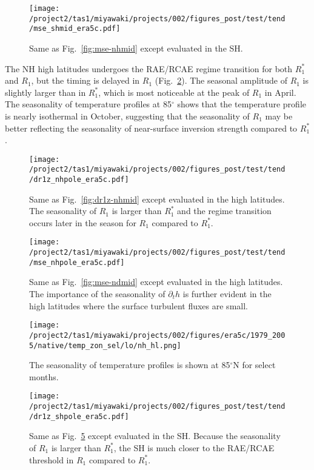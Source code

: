 \documentclass{article}
\begin{document}
\begin{figure}
    \texttt{[image: /project2/tas1/miyawaki/projects/002/figures\_post/test/tend/mse\_shmid\_era5c.pdf]}
    \caption{Same as Fig.~\ref{fig:mse-nhmid} except evaluated in the SH.}
    \label{fig:mse-shmid}
\end{figure}

The NH high latitudes undergoes the RAE/RCAE regime transition for both $R_1^*$ and $R_1$, but the timing is delayed in $R_1$ (Fig.~\ref{fig:dr1z-nhpole}). The seasonal amplitude of $R_1$ is slightly larger than in $R_1^*$, which is most noticeable at the peak of $R_1$ in April. The seasonality of temperature profiles at 85$^\circ$ shows that the temperature profile is nearly isothermal in October, suggesting that the seasonality of $R_1$ may be better reflecting the seasonality of near-surface inversion strength compared to $R_1^*$.

\begin{figure}
    \texttt{[image: /project2/tas1/miyawaki/projects/002/figures\_post/test/tend/dr1z\_nhpole\_era5c.pdf]}
    \caption{Same as Fig.~\ref{fig:dr1z-nhmid} except evaluated in the high latitudes. The seasonality of $R_1$ is larger than $R_1^*$ and the regime transition occurs later in the season for $R_1$ compared to $R_1^*$.}
    \label{fig:dr1z-nhpole}
\end{figure}

\begin{figure}
    \texttt{[image: /project2/tas1/miyawaki/projects/002/figures\_post/test/tend/mse\_nhpole\_era5c.pdf]}
    \caption{Same as Fig.~\ref{fig:mse-ndmid} except evaluated in the high latitudes. The importance of the seasonality of $\partial_t h$ is further evident in the high latitudes where the surface turbulent fluxes are small.}
    \label{fig:mse-nhpole}
\end{figure}

\begin{figure}
    \texttt{[image: /project2/tas1/miyawaki/projects/002/figures/era5c/1979\_2005/native/temp\_zon\_sel/lo/nh\_hl.png]}
    \caption{The seasonality of temperature profiles is shown at 85$^\circ$N for select months.}
    \label{fig:ta-nhpole}
\end{figure}

\begin{figure}
    \texttt{[image: /project2/tas1/miyawaki/projects/002/figures\_post/test/tend/dr1z\_shpole\_era5c.pdf]}
    \caption{Same as Fig.~\ref{fig:dr1z-shpole} except evaluated in the SH. Because the seasonality of $R_1$ is larger than $R_1^*$, the SH is much closer to the RAE/RCAE threshold in $R_1$ compared to $R_1^*$.}
    \label{fig:dr1z-shpole}
\end{figure}
\end{document}

